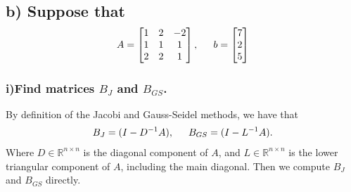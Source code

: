 \documentclass[11pt, letterpaper]{article}
\begin{document}
\subsection*{b) \normalfont Suppose that
\begin{align*}
    A=
    \begin{bmatrix}
        1 & 2 & -2\\
        1 & 1 & 1\\
        2 & 2 & 1
    \end{bmatrix}
    ,\indent b=
    \begin{bmatrix}
        7\\
        2\\
        5
    \end{bmatrix}
\end{align*}
}
\subsubsection*{i)\normalfont Find matrices $B_J$ and $B_{GS}$.}
By definition of the Jacobi and Gauss-Seidel methods, we have that
\begin{align*}
    B_J=(I-D^{-1}A),\indent B_{GS}=(I-L^{-1}A).
\end{align*}
Where $D\in\mathbb{R}^{n\times n}$ is the diagonal component of $A$, and $L\in\mathbb{R}^{n\times n}$
is the lower triangular component of $A$, including the main diagonal. Then we compute $B_J$ and $B_{GS}$
directly.
\end{document}
